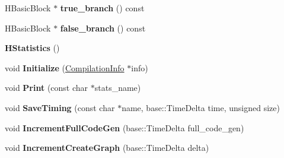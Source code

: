 \begin{DoxyCompactItemize}
\item 
\hypertarget{classv8_1_1internal_1_1_v8___f_i_n_a_l_aa7f2151b4fa02c9754b061a6f8e7a9f0}{}H\+Basic\+Block $\ast$ {\bfseries true\+\_\+branch} () const \label{classv8_1_1internal_1_1_v8___f_i_n_a_l_aa7f2151b4fa02c9754b061a6f8e7a9f0}

\item 
\hypertarget{classv8_1_1internal_1_1_v8___f_i_n_a_l_ac49852e8dba4af679833815e8f5d4326}{}H\+Basic\+Block $\ast$ {\bfseries false\+\_\+branch} () const \label{classv8_1_1internal_1_1_v8___f_i_n_a_l_ac49852e8dba4af679833815e8f5d4326}

\item 
\hypertarget{classv8_1_1internal_1_1_v8___f_i_n_a_l_a38d86270c294d9d2e4768fa4a9f29816}{}{\bfseries H\+Statistics} ()\label{classv8_1_1internal_1_1_v8___f_i_n_a_l_a38d86270c294d9d2e4768fa4a9f29816}

\item 
\hypertarget{classv8_1_1internal_1_1_v8___f_i_n_a_l_afa198860b9aa5d94e154b7e2e948fa3a}{}void {\bfseries Initialize} (\hyperlink{classv8_1_1internal_1_1_compilation_info}{Compilation\+Info} $\ast$info)\label{classv8_1_1internal_1_1_v8___f_i_n_a_l_afa198860b9aa5d94e154b7e2e948fa3a}

\item 
\hypertarget{classv8_1_1internal_1_1_v8___f_i_n_a_l_a03892fc2bda4d0993175d448ddfe7764}{}void {\bfseries Print} (const char $\ast$stats\+\_\+name)\label{classv8_1_1internal_1_1_v8___f_i_n_a_l_a03892fc2bda4d0993175d448ddfe7764}

\item 
\hypertarget{classv8_1_1internal_1_1_v8___f_i_n_a_l_a46c48c6656d0d73fc65f5d66a03bb0e3}{}void {\bfseries Save\+Timing} (const char $\ast$name, base\+::\+Time\+Delta time, unsigned size)\label{classv8_1_1internal_1_1_v8___f_i_n_a_l_a46c48c6656d0d73fc65f5d66a03bb0e3}

\item 
\hypertarget{classv8_1_1internal_1_1_v8___f_i_n_a_l_ac59251e7905ed09fad72e8d871e13d81}{}void {\bfseries Increment\+Full\+Code\+Gen} (base\+::\+Time\+Delta full\+\_\+code\+\_\+gen)\label{classv8_1_1internal_1_1_v8___f_i_n_a_l_ac59251e7905ed09fad72e8d871e13d81}

\item 
\hypertarget{classv8_1_1internal_1_1_v8___f_i_n_a_l_aa4157a1f92a37f0500168f3ce78ffeaf}{}void {\bfseries Increment\+Create\+Graph} (base\+::\+Time\+Delta delta)\label{classv8_1_1internal_1_1_v8___f_i_n_a_l_aa4157a1f92a37f0500168f3ce78ffeaf}


\end{DoxyCompactItemize}
